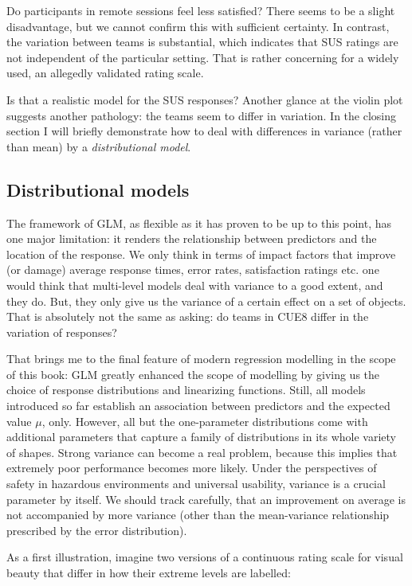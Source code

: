 \documentclass[]{svmono}
\theoremstyle{definition}
\theoremstyle{definition}
\theoremstyle{definition}
\theoremstyle{remark}
\begin{document}
Do participants in remote sessions feel less satisfied? There seems to
be a slight disadvantage, but we cannot confirm this with sufficient
certainty. In contrast, the variation between teams is substantial,
which indicates that SUS ratings are not independent of the particular
setting. That is rather concerning for a widely used, an allegedly
validated rating scale.

Is that a realistic model for the SUS responses? Another glance at the
violin plot suggests another pathology: the teams seem to differ in
variation. In the closing section I will briefly demonstrate how to deal
with differences in variance (rather than mean) by a
\emph{distributional model}.

\subsection{Distributional models}\label{distributional-models}

The framework of GLM, as flexible as it has proven to be up to this
point, has one major limitation: it renders the relationship between
predictors and the location of the response. We only think in terms of
impact factors that improve (or damage) average response times, error
rates, satisfaction ratings etc. one would think that multi-level models
deal with variance to a good extent, and they do. But, they only give us
the variance of a certain effect on a set of objects. That is absolutely
not the same as asking: do teams in CUE8 differ in the variation of
responses?

That brings me to the final feature of modern regression modelling in
the scope of this book: GLM greatly enhanced the scope of modelling by
giving us the choice of response distributions and linearizing
functions. Still, all models introduced so far establish an association
between predictors and the expected value \(\mu\), only. However, all
but the one-parameter distributions come with additional parameters that
capture a family of distributions in its whole variety of shapes. Strong
variance can become a real problem, because this implies that extremely
poor performance becomes more likely. Under the perspectives of safety
in hazardous environments and universal usability, variance is a crucial
parameter by itself. We should track carefully, that an improvement on
average is not accompanied by more variance (other than the
mean-variance relationship prescribed by the error distribution).

As a first illustration, imagine two versions of a continuous rating
scale for visual beauty that differ in how their extreme levels are
labelled:
\end{document}
